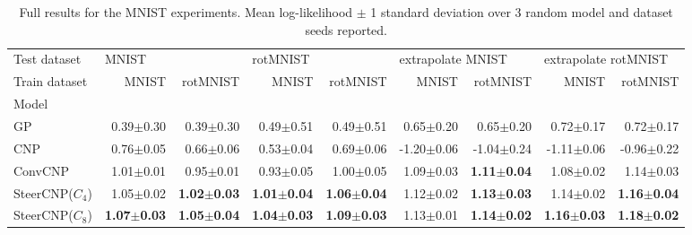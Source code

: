 \begin{table}[t]
	\small
	\centering
	\caption{Full results for the MNIST experiments.
		Mean log-likelihood $\pm$ 1 standard deviation over 3 random model and dataset seeds reported.
	}
	\vspace{0.1in}
	\setlength\tabcolsep{3pt}
	\begin{tabular}{lrrrrrrrr}
		\toprule
		Test dataset       & \multicolumn{2}{l}{MNIST} & \multicolumn{2}{l}{rotMNIST} & \multicolumn{2}{l}{extrapolate MNIST} & \multicolumn{2}{l}{extrapolate rotMNIST}                                                                                                     \\
		Train dataset      & MNIST                     & rotMNIST                     & MNIST                                 & rotMNIST                                 & MNIST                  & rotMNIST               & MNIST                  & rotMNIST               \\
		Model              &                           &                              &                                       &                                          &                        &                        &                        &                        \\
		\midrule
		GP                 & {0.39$\pm$0.30}           & {0.39$\pm$0.30}              & {0.49$\pm$0.51}                       & {0.49$\pm$0.51}                          & {0.65$\pm$0.20}        & {0.65$\pm$0.20}        & {0.72$\pm$0.17}        & {0.72$\pm$0.17}        \\
		CNP                & {0.76$\pm$0.05}           & {0.66$\pm$0.06}              & {0.53$\pm$0.04}                       & {0.69$\pm$0.06}                          & {-1.20$\pm$0.06}       & {-1.04$\pm$0.24}       & {-1.11$\pm$0.06}       & {-0.96$\pm$0.22}       \\
		ConvCNP            & {1.01$\pm$0.01}           & {0.95$\pm$0.01}              & {0.93$\pm$0.05}                       & {1.00$\pm$0.05}                          & {1.09$\pm$0.03}        & \textbf{1.11$\pm$0.04} & {1.08$\pm$0.02}        & {1.14$\pm$0.03}        \\
		SteerCNP($C_4$)    & {1.05$\pm$0.02}           & \textbf{1.02$\pm$0.03}       & \textbf{1.01$\pm$0.04}                & \textbf{1.06$\pm$0.04}                   & {1.12$\pm$0.02}        & \textbf{1.13$\pm$0.03} & {1.14$\pm$0.02}        & \textbf{1.16$\pm$0.04} \\
		SteerCNP($C_{8}$)  & \textbf{1.07$\pm$0.03}    & \textbf{1.05$\pm$0.04}       & \textbf{1.04$\pm$0.03}                & \textbf{1.09$\pm$0.03}                   & {1.13$\pm$0.01}        & \textbf{1.14$\pm$0.02} & \textbf{1.16$\pm$0.03} & \textbf{1.18$\pm$0.02} \\

\end{tabular}
\end{table}
